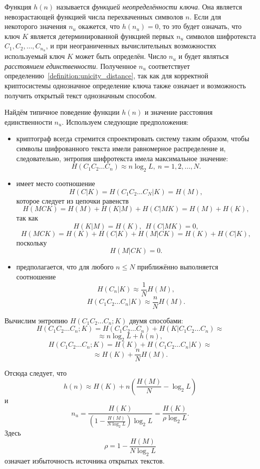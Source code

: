 Функция $h(n)$ называется \emph{функцией неопределённости ключа}. Она является невозрастающей функцией числа перехваченных символов $n$. Если для некоторого значения $n_u$ окажется, что $h ( n_u ) = 0$, то это будет означать, что ключ $K$ является детерминированной функцией первых $n_u$ символов шифротекста $C_1, C_2, \dots, C_{n_u}$, и при неограниченных вычислительных возможностях используемый ключ $K$ может быть определён. Число $n_u$ и будет являться \emph{расстоянием единственности}. Полученное $n_u$ соответствует определению~\ref{definition:unicity_distance}, так как для корректной криптосистемы однозначное определение ключа также означает и возможность получить открытый текст однозначным способом.

Найдём типичное поведение функции $h(n)$ и значение расстояния единственности $n_u$. Используем следующие предположения:
\begin{itemize}
    \item криптограф всегда стремится спроектировать систему таким образом, чтобы символы шифрованного текста имели равномерное распределение и, следовательно, энтропия шифротекста имела максимальное значение:
            \[ H(C_1 C_2 \dots C_n) \approx n \log_2 L, ~ n = 1, 2, \dots, N. \]
    \item имеет место соотношение
            \[ H(C | K) = H(C_1 C_2 \dots C_N | K)  =  H(M), \]
        которое следует из цепочки равенств
            \[ H(MCK) = H(M) + H(K | M) + H(C | MK) = H(M) + H(K), \]
        так как
            \[ H(K | M) = H(K), ~~ H(C | MK) = 0, \]
            \[H(MCK) = H(K) + H(C | K) + H(M | CK) = H(K) + H(C | K), \]
        поскольку
            \[ H(M | CK) = 0. \]
    \item предполагается, что для любого $n \le N$ приближённо выполняется соотношение
        \[ H(C_n | K) \approx \frac{1}{N} H(M), \]
        \[ H(C_1 C_2\dots C_n | K) \approx \frac{n}{N} H(M). \]
\end{itemize}

Вычислим энтропию $H(C_1 C_2 \dots C_n ; K)$ двумя способами:
    \[ H( C_1 C_2 \dots C_n ; K ) = H(C_1 C_2 \dots C_n) + H(K | C_1 C_2 \dots C_n) \approx \]
        \[ \approx n \log_2 L + h(n), \]
    \[ H( C_1 C_2 \dots C_n ; K ) = H(K) + H(C_1 C_2 \dots C_n | K) \approx \]
        \[ \approx H(K) + \frac{n}{N} H(M). \]

Отсюда следует, что
    \[ h(n) \approx H(K) + n \left( \frac{H(M)}{N} - \log_2 L \right) \]
и
    \[ n_u = \frac{H(K)}{ \left( 1 - \frac{H(M)}{N \log_2 L} \right) \log_2 L} = \frac{H(K)}{\rho \log_2 L}. \]
Здесь
    \[ \rho = 1 - \frac{H(M)}{N \log_2 L} \]
означает избыточность источника открытых текстов.

